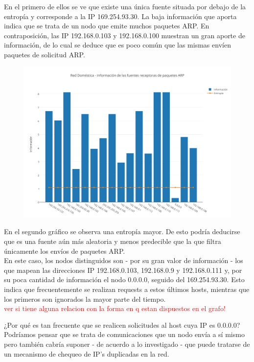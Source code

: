 En el primero de ellos se ve que existe una \'unica fuente situada por debajo de la entrop\'ia y corresponde a la IP 169.254.93.30. La baja informaci\'on que aporta indica que se trata de un nodo que emite muchos paquetes ARP. En contraposici\'on, las IP 192.168.0.103 y 192.168.0.100 muestran un gran aporte de informaci\'on, de lo cual se deduce que es poco com\'un que las mismas env\'ien paquetes de solicitud ARP.


\begin{figure}[h!]
    \centering                                                       
    \includegraphics[width=400pt]{img/RedDomesticaFuentesReceptorasARP}
    \caption{}
    \label{domesticaReceptoras}
\end{figure}

En el segundo gr\'afico se observa una entrop\'ia mayor. De esto podr\'ia deducirse que es una fuente a\'un m\'as aleatoria y menos predecible que la que filtra \'unicamente los env\'ios de paquetes ARP.\\
En este caso, los nodos distinguidos son - por su gran valor de informaci\'on - los que mapean las direcciones IP 192.168.0.103, 192.168.0.9 y 192.168.0.111 y, por su poca cantidad de informaci\'on el nodo 0.0.0.0, seguido del 169.254.93.30. Esto indica que frecuentemente se realizan requests a estos \'ultimos hosts, mientras que los primeros son ignorados la mayor parte del tiempo. \\
\textcolor{red}{ver si tiene alguna relacion con la forma en q estan dispuestos en el grafo!}

¿Por qu\'e es tan frecuente que se realicen solicitudes al host cuya IP es 0.0.0.0? Podr\'iamos pensar que se trata de comunicaciones que un nodo env\'ia a s\'i mismo pero tambi\'en cabr\'ia suponer - de acuerdo a lo investigado - que puede tratarse de un mecanismo de chequeo de IP's duplicadas en la red.\\

